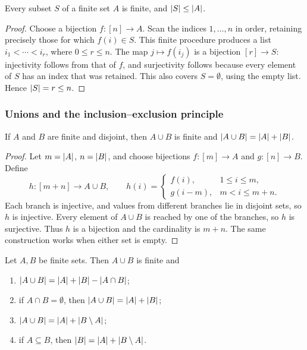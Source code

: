 \documentclass[11pt,a4paper]{amsart}
\begin{document}
\begin{lemma}\label{lem:finite-subsets}
  Every subset \(S\) of a finite set \(A\) is finite, and
  \(\lvert S\rvert\leq\lvert A\rvert\).
\end{lemma}

\begin{proof}
  Choose a bijection \(f\colon[n]\to A\). Scan the indices
  \(1,\ldots,n\) in order, retaining precisely those for which
  \(f(i)\in S\). This finite procedure produces a list
  \(i_1<\cdots<i_r\), where \(0\leq r\leq n\). The map
  \(j\mapsto f(i_j)\) is a bijection \([r]\to S\): injectivity
  follows from that of \(f\), and surjectivity follows because every
  element of \(S\) has an index that was retained. This also covers
  \(S=\emptyset\), using the empty list. Hence \(\lvert S\rvert=r\leq n\).
\end{proof}

\subsubsection{Unions and the inclusion--exclusion principle}

\begin{lemma}\label{lem:disjoint-counting}
  If \(A\) and \(B\) are finite and disjoint, then \(A\cup B\) is
  finite and \(\lvert A\cup B\rvert=\lvert A\rvert+\lvert B\rvert\).
\end{lemma}

\begin{proof}
  Let \(m=\lvert A\rvert\), \(n=\lvert B\rvert\), and choose bijections
  \(f\colon[m]\to A\) and \(g\colon[n]\to B\). Define
  \[
    h\colon[m+n]\to A\cup B,\qquad
    h(i)=
    \begin{cases}
      f(i),&1\leq i\leq m,\\
      g(i-m),&m<i\leq m+n.
    \end{cases}
  \]
  Each branch is injective, and values from different branches lie in
  disjoint sets, so \(h\) is injective. Every element of \(A\cup B\)
  is reached by one of the branches, so \(h\) is surjective. Thus
  \(h\) is a bijection and the cardinality is \(m+n\). The same
  construction works when either set is empty.
\end{proof}

\begin{theorem}\label{thm:two-set-counting}
  Let \(A,B\) be finite sets. Then \(A\cup B\) is finite and
  \begin{enumerate}[label=(\alph*)]
    \item \(\lvert A\cup B\rvert=\lvert A\rvert+\lvert B\rvert-\lvert A\cap B\rvert\);
    \item if \(A\cap B=\emptyset\), then
      \(\lvert A\cup B\rvert=\lvert A\rvert+\lvert B\rvert\);
    \item \(\lvert A\cup B\rvert=\lvert A\rvert+\lvert B\setminus A\rvert\);
    \item if \(A\subseteq B\), then
      \(\lvert B\rvert=\lvert A\rvert+\lvert B\setminus A\rvert\).
  \end{enumerate}
\end{theorem}
\end{document}
